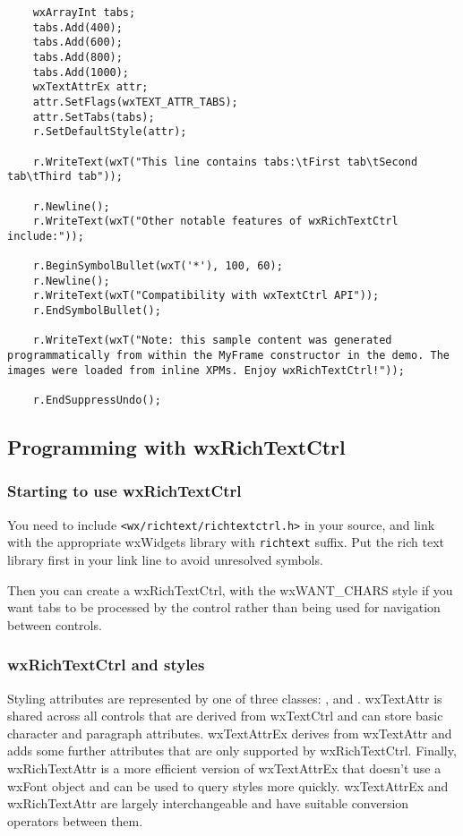 {\begin{verbatim}
    wxArrayInt tabs;
    tabs.Add(400);
    tabs.Add(600);
    tabs.Add(800);
    tabs.Add(1000);
    wxTextAttrEx attr;
    attr.SetFlags(wxTEXT_ATTR_TABS);
    attr.SetTabs(tabs);
    r.SetDefaultStyle(attr);
    
    r.WriteText(wxT("This line contains tabs:\tFirst tab\tSecond tab\tThird tab"));

    r.Newline();
    r.WriteText(wxT("Other notable features of wxRichTextCtrl include:"));

    r.BeginSymbolBullet(wxT('*'), 100, 60);
    r.Newline();
    r.WriteText(wxT("Compatibility with wxTextCtrl API"));
    r.EndSymbolBullet();

    r.WriteText(wxT("Note: this sample content was generated programmatically from within the MyFrame constructor in the demo. The images were loaded from inline XPMs. Enjoy wxRichTextCtrl!"));

    r.EndSuppressUndo();
\end{verbatim}
}

\subsection{Programming with wxRichTextCtrl}

\subsubsection{Starting to use wxRichTextCtrl}

You need to include {\tt <wx/richtext/richtextctrl.h>} in your source, and link
with the appropriate wxWidgets library with {\tt richtext} suffix. Put the rich text
library first in your link line to avoid unresolved symbols.

Then you can create a wxRichTextCtrl, with the wxWANT\_CHARS style if you want tabs to
be processed by the control rather than being used for navigation between controls.

\subsubsection{wxRichTextCtrl and styles}

Styling attributes are represented by one of three classes: ,  and .
wxTextAttr is shared across all controls that are derived from wxTextCtrl and
can store basic character and paragraph attributes. wxTextAttrEx derives
from wxTextAttr and adds some further attributes that are only supported
by wxRichTextCtrl. Finally, wxRichTextAttr is a more efficient version
of wxTextAttrEx that doesn't use a wxFont object and can be used to
query styles more quickly. wxTextAttrEx and wxRichTextAttr are largely
interchangeable and have suitable conversion operators between them.

